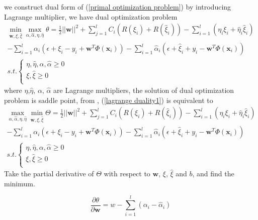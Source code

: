 \documentclass[12pt, draftclsnofoot, onecolumn]{IEEEtran}
\begin{document}
we construct dual form of (\ref{primal optimization problem}) by introducing Lagrange multiplier, we have dual optimization problem
\begin{eqnarray}
\nonumber
\min_{\mathbf{w}, \xi, \hat{\xi}} \max_{\alpha, \hat{\alpha}, \eta, \hat{\eta}}\theta=
\frac{1}{2}||\mathbf{w}||^{2}+\sum_{j=1}^{l}C_{i}(R(\xi_{i})+R(\hat{\xi}_{i}))-\sum_{i=1}^{l}(\eta_{i}\xi_{i}+\hat{\eta}_{i}\hat{\xi}_{i})\\
\nonumber
-\sum_{i=1}^{l}\alpha_{i}(\epsilon+\xi_{i}-y_{i}+\mathbf{w}^{T}\Phi(\mathbf{x}_{i}))-\sum_{i=1}^{l}\hat{\alpha}_{i}(\epsilon+\hat{\xi}_{i}+y_{i}-\mathbf{w}^{T}\Phi(\mathbf{x}_{i}))\\
s.t. \left\{\begin{array}{cc}
\eta, \hat{\eta}, \alpha, \hat{\alpha}\geq 0\\
\xi, \hat{\xi}\geq  0\\
\end{array}\right. 
\label{lagrange duality1}
\end{eqnarray}
where $\eta$,$\hat{\eta}$, $\alpha$, $\hat{\alpha}$ are Lagrange multipliers, the solution of dual optimization problem is saddle point, from \cite{saddle point}, (\ref{lagrange duality1}) is equivalent to
\begin{eqnarray}
\nonumber
\max_{\alpha, \hat{\alpha}, \eta, \hat{\eta}}\min_{\mathbf{w}, \xi, \hat{\xi}} \Theta=
\frac{1}{2}||\mathbf{w}||^{2}+\sum_{j=1}^{l}C_{i}(R(\xi_{i})+R(\hat{\xi}_{i}))-\sum_{i=1}^{l}(\eta_{i}\xi_{i}+\hat{\eta}_{i}\hat{\xi}_{i})\\
\nonumber
-\sum_{i=1}^{l}\alpha_{i}(\epsilon+\xi_{i}-y_{i}+\mathbf{w}^{T}\Phi(\mathbf{x}_{i}))-\sum_{i=1}^{l}\hat{\alpha}_{i}(\epsilon+\hat{\xi}_{i}+y_{i}-\mathbf{w}^{T}\Phi(\mathbf{x}_{i}))\\ 
s.t. \left\{\begin{array}{cc}
\eta, \hat{\eta}, \alpha, \hat{\alpha}\geq 0\\
\xi, \hat{\xi}\geq  0\\
\end{array}\right.\label{lagrange duality2}
\end{eqnarray}
Take the partial derivative of $\Theta$ with respect to $\mathbf{w}$, $\xi$, $\hat{\xi}$ and $b$, and find the minimum.

\begin{equation}
\frac{\partial \theta}{\partial \mathbf{w}}=w-\sum_{i=1}^{l}(\alpha_{i}-\hat{\alpha}_{i})
\label{partial1}
\end{equation}
\end{document}
